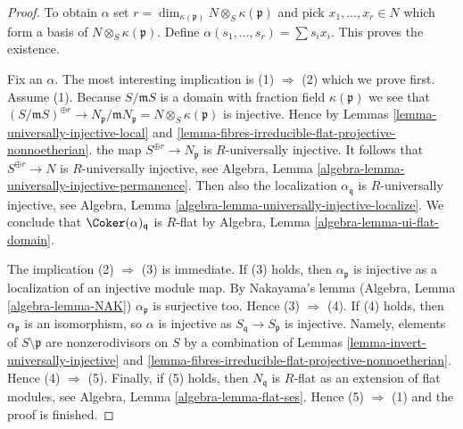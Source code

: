 \begin{proof}
To obtain $\alpha$ set
$r = \dim_{\kappa(\mathfrak p)} N \otimes_S \kappa(\mathfrak p)$ and pick
$x_1, \ldots, x_r \in N$ which form a basis of
$N \otimes_S \kappa(\mathfrak p)$. Define
$\alpha(s_1, \ldots, s_r) = \sum s_i x_i$. This proves the existence.

\medskip\noindent
Fix an $\alpha$. The most interesting implication is
(1) $\Rightarrow$ (2) which we prove first. Assume (1).
Because $S/\mathfrak mS$ is a domain with fraction field $\kappa(\mathfrak p)$
we see that
$(S/\mathfrak mS)^{\oplus r} \to
N_{\mathfrak p}/\mathfrak mN_{\mathfrak p} = N \otimes_S \kappa(\mathfrak p)$
is injective. Hence by
Lemmas \ref{lemma-universally-injective-local} and
\ref{lemma-fibres-irreducible-flat-projective-nonnoetherian}.
the map $S^{\oplus r} \to N_{\mathfrak p}$ is $R$-universally injective.
It follows that $S^{\oplus r} \to N$ is $R$-universally injective, see
Algebra, Lemma \ref{algebra-lemma-universally-injective-permanence}.
Then also the localization $\alpha_{\mathfrak q}$ is $R$-universally
injective, see
Algebra, Lemma \ref{algebra-lemma-universally-injective-localize}.
We conclude that $\Coker(\alpha)_{\mathfrak q}$ is $R$-flat by
Algebra, Lemma \ref{algebra-lemma-ui-flat-domain}.

\medskip\noindent
The implication (2) $\Rightarrow$ (3) is immediate. If (3) holds, then
$\alpha_{\mathfrak p}$ is injective as a localization of an injective
module map. By Nakayama's lemma
(Algebra, Lemma \ref{algebra-lemma-NAK})
$\alpha_{\mathfrak p}$ is surjective too. Hence (3) $\Rightarrow$ (4).
If (4) holds, then $\alpha_{\mathfrak p}$ is an isomorphism, so
$\alpha$ is injective as $S_{\mathfrak q} \to S_{\mathfrak p}$ is injective.
Namely, elements of $S \setminus \mathfrak p$ are nonzerodivisors on $S$
by a combination of
Lemmas \ref{lemma-invert-universally-injective} and
\ref{lemma-fibres-irreducible-flat-projective-nonnoetherian}.
Hence (4) $\Rightarrow$ (5). Finally, if (5) holds, then
$N_{\mathfrak q}$ is $R$-flat as an extension of flat modules, see
Algebra, Lemma \ref{algebra-lemma-flat-ses}.
Hence (5) $\Rightarrow$ (1) and the proof is finished.
\end{proof}
